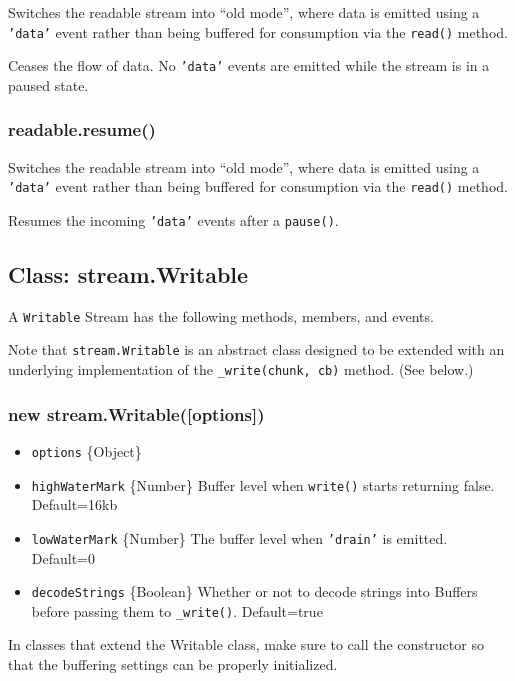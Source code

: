Switches the readable stream into ``old mode'', where data is emitted
using a \texttt{'data'} event rather than being buffered for consumption
via the \texttt{read()} method.

Ceases the flow of data. No \texttt{'data'} events are emitted while the
stream is in a paused state.

\subsubsection{readable.resume()}

Switches the readable stream into ``old mode'', where data is emitted
using a \texttt{'data'} event rather than being buffered for consumption
via the \texttt{read()} method.

Resumes the incoming \texttt{'data'} events after a \texttt{pause()}.

\subsection{Class: stream.Writable}

A \texttt{Writable} Stream has the following methods, members, and
events.

Note that \texttt{stream.Writable} is an abstract class designed to be
extended with an underlying implementation of the
\texttt{\_write(chunk, cb)} method. (See below.)

\subsubsection{new stream.Writable({[}options{]})}

\begin{itemize}
\item
  \texttt{options} \{Object\}
\item
  \texttt{highWaterMark} \{Number\} Buffer level when \texttt{write()}
  starts returning false. Default=16kb
\item
  \texttt{lowWaterMark} \{Number\} The buffer level when
  \texttt{'drain'} is emitted. Default=0
\item
  \texttt{decodeStrings} \{Boolean\} Whether or not to decode strings
  into Buffers before passing them to \texttt{\_write()}. Default=true
\end{itemize}

In classes that extend the Writable class, make sure to call the
constructor so that the buffering settings can be properly initialized.

